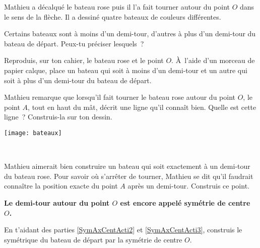 \newpage



\begin{activite}

Mathieu a décalqué le bateau rose puis il l'a fait tourner autour du point $O$ dans le sens de la flèche. Il a dessiné quatre bateaux de couleurs différentes.

\vspace{1em}

\begin{minipage}[c]{0.52\linewidth}
\begin{partie}
Certains bateaux sont à moins d'un demi-tour, d'autres à plus d'un demi-tour du bateau de départ. Peux-tu préciser lesquels ?
\end{partie}

\begin{partie}
Reproduis, sur ton cahier, le bateau rose et le point $O$. À l'aide d'un morceau de papier calque, place un bateau qui soit à moins d'un demi-tour et un autre qui soit à plus d'un demi-tour du bateau de départ.
\end{partie}

\begin{partie} \label{SymAxCentActi2}
Mathieu remarque que lorsqu'il fait tourner le bateau rose autour du point $O$, le point $A$, tout en haut du mât, décrit une ligne qu'il connaît bien. Quelle est cette ligne ? Construis-la sur ton dessin.
\end{partie}
 \end{minipage}
   \quad \begin{minipage}[c]{0.26\linewidth}
  \texttt{[image: bateaux]}
  \end{minipage} \\

\begin{partie} \label{SymAxCentActi3}
Mathieu aimerait bien construire un bateau qui soit exactement à un demi-tour du bateau rose. Pour savoir où s'arrêter de tourner, Mathieu se dit qu'il faudrait connaître la position exacte du point $A$ après un demi-tour. Construis ce point.
\begin{center} \textbf{\textcolor{H1}{Le demi-tour autour du point $O$ est encore appelé symétrie de centre $O$.}} \end{center}
\end{partie}

\begin{partie}
En t'aidant des parties \ref{SymAxCentActi2} et \ref{SymAxCentActi3}, construis le symétrique du bateau de départ par la symétrie de centre $O$.
\end{partie}

\end{activite}

